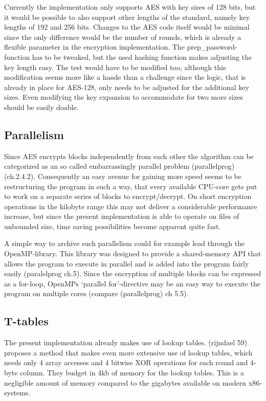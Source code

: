 Currently the implementation only supports AES with key sizes of 128
bits, but it would be possible to also support other lengths of the
standard, namely key lengths of 192 and 256 bits. Changes to the AES
code itself would be minimal since the only difference would be the
number of rounds, which is already a flexible parameter in the
encryption implementation. The prep\_password-function has to be
tweaked, but the used hashing function makes adjusting the key length
easy. The test would have to be modified too, although this modification
seems more like a hassle than a challenge since the logic, that is
already in place for AES-128, only needs to be adjusted for the
additional key sizes. Even modifying the key expansion to accommodate
for two more sizes should be easily doable.

\hypertarget{parallelism}{%
\subsection{Parallelism}\label{parallelism}}

Since AES encrypts blocks independently from each other the algorithm
can be categorized as an so called embarrassingly parallel problem
(parallelprog)(ch.2.4.2). Consequently an easy avenue for gaining more
speed seems to be restructuring the program in such a way, that every
available CPU-core gets put to work on a separate series of blocks to
encrypt/decrypt. On short encryption operations in the kilobyte range
this may not deliver a considerable performance increase, but since the
present implementation is able to operate on files of unbounded size,
time saving possibilities become apparent quite fast.

A simple way to archive such parallelism could for example lead through
the OpenMP-library. This library was designed to provide a shared-memory
API that allows the program to execute in parallel and is added into the
program fairly easily (paralelprog ch.5). Since the encryption of
multiple blocks can be expressed as a for-loop, OpenMPs `parallel
for'-directive may be an easy way to execute the program on multiple
cores (compare (parallelprog) ch 5.5).

\hypertarget{t-tables}{%
\subsection{T-tables}\label{t-tables}}

The present implementation already makes use of lookup tables. (rijndael
59) proposes a method that makes even more extensive use of lookup
tables, which needs only 4 array accesses and 4 bitwise XOR operations
for each round and 4-byte column. They budget in 4kb of memory for the
lookup tables. This is a negligible amount of memory compared to the
gigabytes available on modern x86-systems.

